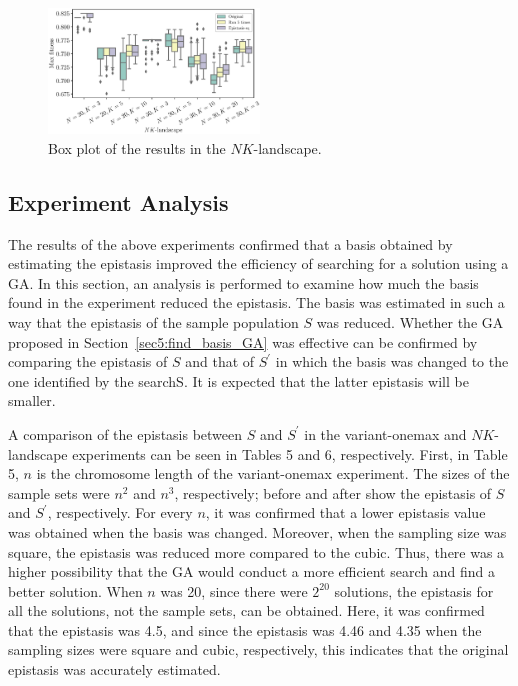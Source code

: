 \begin{figure}[ht!]
	\centering
	\includegraphics[width=0.5\textwidth]{./boxplot_NK}
	\caption{Box plot of the results in the $ NK $-landscape.} \label{fig:boxplot_nk}
\end{figure}

\subsection{Experiment Analysis}
The results of the above experiments confirmed that a basis obtained by estimating the epistasis improved the efficiency of searching for a solution using a GA. In this section, an analysis is performed to examine how much the basis found in the experiment reduced the epistasis. The basis was estimated in such a way that the epistasis of the sample population $ S $ was reduced. Whether the GA proposed in Section~\ref{sec5:find_basis_GA} was effective can be confirmed by comparing the epistasis of $ S $ and that of $ S^\prime $ in which the basis was changed to the one identified by the searchS. It is expected that the latter epistasis will be smaller.

A comparison of the epistasis between $ S $ and $ S^\prime $ in the variant-onemax and $ NK $-landscape experiments can be seen in Tables 5 and 6, respectively. First, in Table 5, $ n $ is the chromosome length of the variant-onemax experiment. The sizes of the sample sets were $ n^2 $ and $ n^3 $, respectively; before and after show the epistasis of $ S $ and $ S^\prime $, respectively. For every $ n $, it was confirmed that a lower epistasis value was obtained when the basis was changed. Moreover, when the sampling size was square, the epistasis was reduced more compared to the cubic. Thus, there was a higher possibility that the GA would conduct a more efficient search and find a better solution. When $ n $ was 20, since there were $ 2^{20} $ solutions, the epistasis for all the solutions, not the sample sets, can be obtained. Here, it was confirmed that the epistasis was 4.5, and since the epistasis was 4.46 and 4.35 when the sampling sizes were square and cubic, respectively, this indicates that the original epistasis was accurately estimated.

